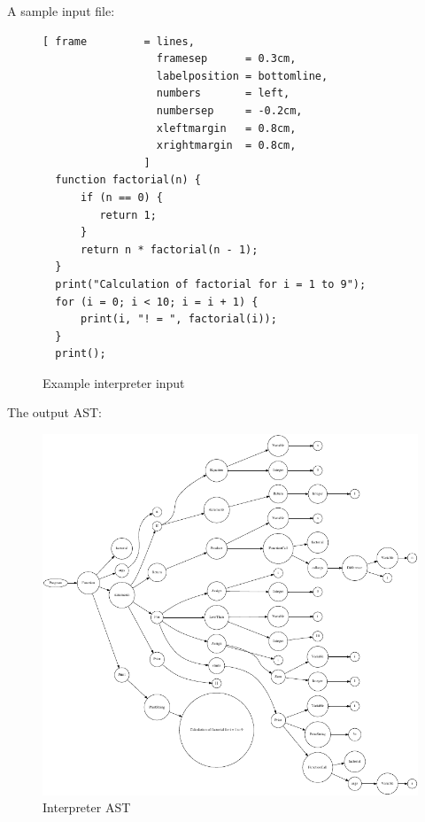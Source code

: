 A sample input file:
\begin{figure}[!ht]

\begin{Verbatim}[ frame         = lines, 
                  framesep      = 0.3cm, 
                  labelposition = bottomline,
                  numbers       = left,
                  numbersep     = -0.2cm,
                  xleftmargin   = 0.8cm,
                  xrightmargin  = 0.8cm,
                ]
  function factorial(n) {
      if (n == 0) {
         return 1;
      }
      return n * factorial(n - 1);
  }
  print("Calculation of factorial for i = 1 to 9");
  for (i = 0; i < 10; i = i + 1) {
      print(i, "! = ", factorial(i));
  }
  print();
		\end{Verbatim}
\caption{Example interpreter input}
\label{fig:example_interpreter_input}
\end{figure}
%
The output AST:
%


\begin{figure}
	\centering
		\includegraphics{interpreter_tree.pdf}
	\caption{Interpreter AST}
	\label{fig:interpreter_tree}
\end{figure}

